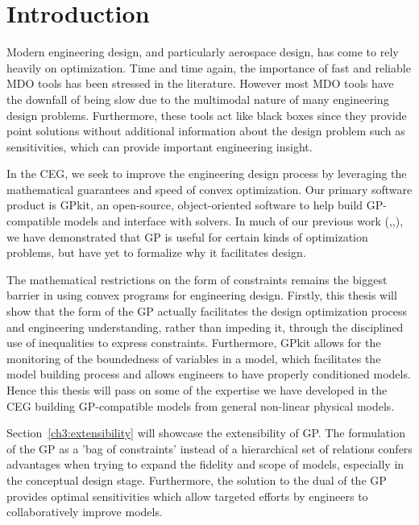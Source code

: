 \chapter{Introduction}
\label{ch1_intro}

Modern engineering design, and particularly aerospace design, has come to rely
heavily on optimization. Time and time again, the importance of fast and
reliable \gls{MDO} tools has been stressed in the literature. %
However most \gls{MDO} tools
have the downfall of being slow due to the multimodal nature of many
engineering design problems. Furthermore, these tools act like black boxes since
they provide point solutions without additional information about the design problem
such as sensitivities, which can provide important engineering insight.
%

In the \gls{CEG}, we seek to improve the engineering design process by
leveraging the mathematical guarantees and speed of convex optimization.
Our primary software product is GPkit, an
open-source, object-oriented software to help build \gls{GP}-compatible models and
interface with solvers. In much of our previous work
(\cite{gp_ac_design},\cite{sp_ac_design},\cite{sp_engine}), we have demonstrated that
\gls{GP} is useful for certain kinds of optimization problems, but have yet to formalize why it
facilitates design.

The mathematical restrictions on the form of constraints remains the biggest
barrier in using convex programs for engineering design. Firstly, this thesis will
show that the form of the \gls{GP} actually facilitates the design
optimization process
and engineering understanding, rather than impeding it, through the disciplined use
of inequalities to express constraints. Furthermore, GPkit allows for the
monitoring of the boundedness of variables in a model, which facilitates the model
building process and allows engineers
to have properly conditioned models. Hence this thesis will
pass on some of the expertise we have developed in the \gls{CEG} building
\gls{GP}-compatible models from general non-linear physical models.

Section~\ref{ch3:extensibility} will showcase the extensibility of \gls{GP}.
The formulation of the \gls{GP} as a 'bag of
constraints' instead of a hierarchical set of relations confers advantages
when trying to expand the fidelity and scope of models, especially in the
conceptual design stage. Furthermore, the solution to the dual of the \gls{GP}
provides optimal sensitivities which allow targeted efforts by engineers to
collaboratively improve models.

